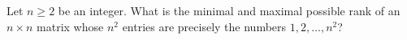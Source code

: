 Let $ n\ge 2$ be an integer. What is the minimal and maximal possible rank of an $ n\times n$ matrix whose $ n^{2}$ entries are precisely the numbers $ 1, 2, \ldots, n^{2}$?